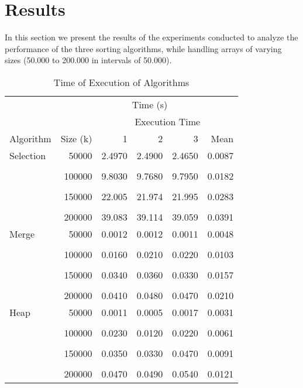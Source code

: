 \documentclass[conference]{IEEEtran}
\providecommand{\tabularnewline}{\\}
\begin{document}
\section{Results}
In this section we present the results of the experiments conducted to analyze the performance of the three sorting algorithms, while handling arrays of varying sizes (50.000 to 200.000 in intervals of 50.000).
\begin{table}[H]
    \caption{Time of Execution of Algorithms\label{tab:tiempos}}
    \centering{}
    \begin{tabular}{lrrrrr}
        \toprule
        &  & \multicolumn{3}{c}{Time (s)}\tabularnewline
        \cmidrule{1-6}
        &  & \multicolumn{4}{c}{Execution Time}\tabularnewline
        \cmidrule{3-5}
        Algorithm & Size (k) & 1 & 2 & 3 & Mean\tabularnewline
        \midrule
        Selection & 50000 & 2.4970 & 2.4900 & 2.4650 & 0.0087\tabularnewline
        \tabularnewline
        & 100000 & 9.8030 & 9.7680 & 9.7950 & 0.0182\tabularnewline
        \tabularnewline
        & 150000 & 22.005 & 21.974 & 21.995 & 0.0283\tabularnewline
        \tabularnewline
        & 200000 & 39.083 & 39.114 & 39.059 & 0.0391\tabularnewline
        \midrule
        Merge & 50000 & 0.0012 & 0.0012 & 0.0011 & 0.0048\tabularnewline
        \tabularnewline
        & 100000 & 0.0160 & 0.0210 & 0.0220 & 0.0103\tabularnewline
        \tabularnewline
        & 150000 & 0.0340 & 0.0360 & 0.0330 & 0.0157\tabularnewline
        \tabularnewline
        & 200000 & 0.0410 & 0.0480 & 0.0470 & 0.0210\tabularnewline
        \midrule
        Heap & 50000 & 0.0011 & 0.0005 & 0.0017 & 0.0031\tabularnewline
        \tabularnewline
        & 100000 & 0.0230 & 0.0120 & 0.0220 & 0.0061\tabularnewline
        \tabularnewline
        & 150000 & 0.0350 & 0.0330 & 0.0470 & 0.0091\tabularnewline
        \tabularnewline
        & 200000 & 0.0470 & 0.0490 & 0.0540 & 0.0121\tabularnewline
        \bottomrule
    \end{tabular}
\end{table}
\end{document}
